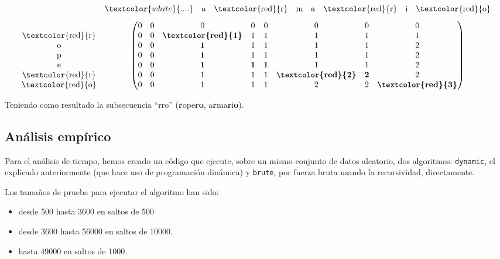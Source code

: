\documentclass[10pt, a4paper]{article}
\theoremstyle{theorem-style}
\theoremstyle{theorem-style}
\theoremstyle{definition-style}
\theoremstyle{remark-style}
\theoremstyle{example-style}
\theoremstyle{definition-style}
\theoremstyle{remark-style}
\begin{document}
$$
\begin{matrix}
 & \begin{matrix} \textcolor{white}{....}\vspace{0.3cm}&\text{{a}} & \text{\textcolor{red}{r}} & \text{{m}} & \text{{a}} & \text{\textcolor{red}{r}} & \text{{i}} & \text{\textcolor{red}{o}} \end{matrix} \\
\begin{matrix}\\ \text{\textcolor{red}{r}}\\\text{{o}}\\\text{{p}}\\\text{{e}}\\\text{\textcolor{red}{r}}\\\text{{\textcolor{red}{o}}} \end{matrix} & \left(\begin{matrix}
0 & 0 & 0 &0&0&0&0&0\\
0&0&\textbf{\textcolor{red}{1}}&1&1&1&1&1\\
0&0&\textbf{1}&1&1&1&1&2\\
0&0&\textbf{1}&1&1&1&1&2\\
0&0&\textbf{1}&\textbf{1}&\textbf{1}&1&1&2\\
0&0&1&1&1&\textbf{\textcolor{red}{2}}&\textbf{2}&2\\
0&0&1&1&1&2&2&\textbf{\textcolor{red}{3}}\\
\end{matrix}\right)
\end{matrix}
$$

Teniendo como resultado la subsecuencia ``rro'' (\textbf{r}ope\textbf{ro}, a\textbf{r}ma\textbf{r}i\textbf{o}).

\pagebreak
\subsection{Análisis empírico}

Para el análisis de tiempo, hemos creado un código que ejecute, sobre un mismo conjunto de datos aleatorio, dos algoritmos: \texttt{dynamic}, el explicado anteriormente (que hace uso de programación dinámica) y \texttt{brute}, por fuerza bruta usando la recursividad, directamente.

Los tamaños de prueba para ejecutar el algoritmo han sido:
\begin{itemize}
	\item desde 500 hasta 3600 en saltos de 500
	\item desde 3600 hasta 56000 en saltos de 10000.
	\item hasta 49000 en saltos de 1000.
\end{itemize}
\end{document}
